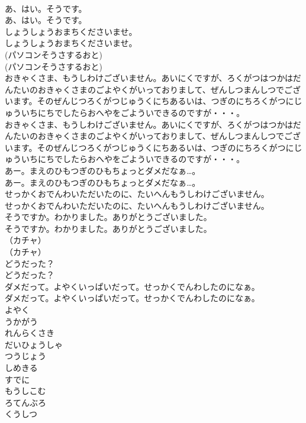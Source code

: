 \documentclass[8pt]{extreport}
\begin{document}
\begin{CJK}{UTF8}{min}
\\	あ、はい。そうです。
\\	あ、はい。そうです。
\\	しょうしょうおまちくださいませ。
\\	しょうしょうおまちくださいませ。
\\	(パソコンそうさするおと)
\\	(パソコンそうさするおと)
\\	おきゃくさま、もうしわけございません。あいにくですが、ろくがつはつかはだんたいのおきゃくさまのごよやくがいっておりまして、ぜんしつまんしつでございます。そのぜんじつろくがつじゅうくにちあるいは、つぎのにちろくがつにじゅういちにちでしたらおへやをごよういできるのですが・・・。
\\	おきゃくさま、もうしわけございません。あいにくですが、ろくがつはつかはだんたいのおきゃくさまのごよやくがいっておりまして、ぜんしつまんしつでございます。そのぜんじつろくがつじゅうくにちあるいは、つぎのにちろくがつにじゅういちにちでしたらおへやをごよういできるのですが・・・。
\\	あー。まえのひもつぎのひもちょっとダメだなぁ…。
\\	あー。まえのひもつぎのひもちょっとダメだなぁ…。
\\	せっかくおでんわいただいたのに、たいへんもうしわけございません。
\\	せっかくおでんわいただいたのに、たいへんもうしわけございません。
\\	そうですか。わかりました。ありがとうございました。
\\	そうですか。わかりました。ありがとうございました。
\\	（カチャ）
\\	（カチャ）
\\	どうだった？
\\	どうだった？
\\	ダメだって。よやくいっぱいだって。せっかくでんわしたのになぁ。
\\	ダメだって。よやくいっぱいだって。せっかくでんわしたのになぁ。
\\	よやく
\\	うかがう
\\	れんらくさき
\\	だいひょうしゃ
\\	つうじょう
\\	しめきる
\\	すでに
\\	もうしこむ
\\	ろてんぶろ
\\	くうしつ

\end{CJK}
\end{document}
